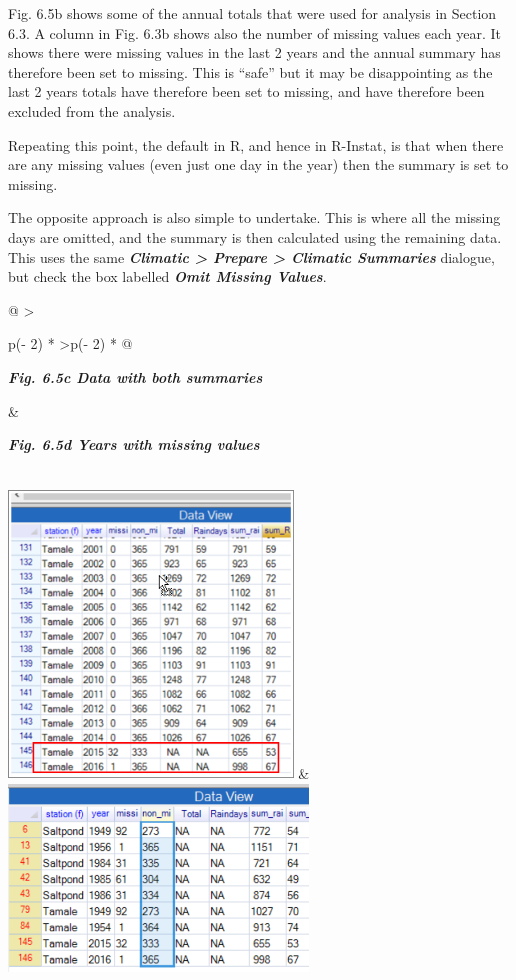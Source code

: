 \documentclass[
  letterpaper,
  DIV=11,
  numbers=noendperiod]{scrreprt}
\begin{document}
Fig. 6.5b shows some of the annual totals that were used for analysis in
Section 6.3. A column in Fig. 6.3b shows also the number of missing
values each year. It shows there were missing values in the last 2 years
and the annual summary has therefore been set to missing. This is
``safe'' but it may be disappointing as the last 2 years totals have
therefore been set to missing, and have therefore been excluded from the
analysis.

Repeating this point, the default in R, and hence in R-Instat, is that
when there are any missing values (even just one day in the year) then
the summary is set to missing.

The opposite approach is also simple to undertake. This is where all the
missing days are omitted, and the summary is then calculated using the
remaining data. This uses the same \textbf{\emph{Climatic \textgreater{}
Prepare \textgreater{} Climatic Summaries}} dialogue, but check the box
labelled \textbf{\emph{Omit Missing Values}}.

\begin{longtable}[]{@{}
  >{\raggedright\arraybackslash}p{(\columnwidth - 2\tabcolsep) * }
  >{\raggedleft\arraybackslash}p{(\columnwidth - 2\tabcolsep) * }@{}}
\toprule\noalign{}
\begin{minipage}[b]{\linewidth}\raggedright
\textbf{\emph{Fig. 6.5c Data with both summaries}}
\end{minipage} & \begin{minipage}[b]{\linewidth}\raggedleft
\textbf{\emph{Fig. 6.5d Years with missing values}}
\end{minipage} \\
\midrule\noalign{}
\endhead
\bottomrule\noalign{}
\endlastfoot
\includegraphics[width=2.97396in,height=3.0356in]{figures/Fig6.5c.png} &
\includegraphics[width=3.13029in,height=1.95156in]{figures/Fig6.5d.png} \\
\end{longtable}
\end{document}
